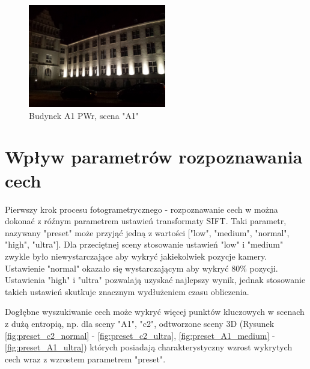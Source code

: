 \begin{figure}[h]
   \centering
   \includegraphics[width=6cm]{img/A1.jpg}
   \caption{Budynek A1 PWr, scena "A1"}
   \label {fig:scene_A1}
\end{figure}


\section{Wpływ parametrów rozpoznawania cech}

Pierwszy krok procesu fotogrametrycznego - rozpoznawanie cech w można dokonać z róźnym parametrem ustawień transformaty SIFT. Taki parametr, nazywany "preset" może przyjąć jedną z wartości ["low", "medium", "normal", "high", "ultra"]. Dla przeciętnej sceny stosowanie ustawień "low" i "medium" zwykle było niewystarczające aby wykryć jakiekolwiek pozycje kamery. Ustawienie "normal" okazało się wystarczającym aby wykryć 80\% pozycji. Ustawienia "high" i "ultra" pozwalają uzyskać najlepszy wynik, jednak stosowanie takich ustawień skutkuje znacznym wydłużeniem czasu obliczenia.

Dogłębne wyszukiwanie cech może wykryć więcej punktów kluczowych w scenach z dużą entropią, np. dla sceny "A1", "c2", odtworzone sceny 3D (Rysunek \ref{fig:preset_c2_normal} - \ref{fig:preset_c2_ultra}, \ref{fig:preset_A1_medium} -  \ref{fig:preset_A1_ultra}) których posiadają charakterystyczny wzrost wykrytych cech wraz z wzrostem parametrem "preset".

